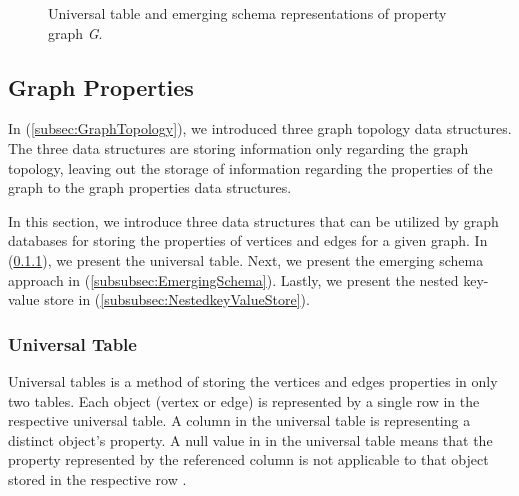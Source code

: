 {\begin{figure}[H]
{        \label{fig:VertexEmergingSchema}
    }
\centering
    \caption{Universal table and emerging schema representations of property graph \textit{G}.}
    \label{fig:GraphProperties_logical}
\end{figure}

\subsection{Graph Properties}
\label{subsec:GraphProperties}

In (\ref{subsec:GraphTopology}), we introduced three graph topology data structures. The three data structures are storing information only regarding the graph topology, leaving out the storage of information regarding the properties of the graph to the graph properties data structures. 

In this section, we introduce three data structures that can be utilized by graph databases for storing the properties of vertices and edges for a given graph. In (\ref{subsubsec:UniversalTable}), we present the universal table. Next, we present the emerging schema approach in (\ref{subsubsec:EmergingSchema}). Lastly, we present the nested key-value store in (\ref{subsubsec:NestedkeyValueStore}).

\subsubsection{Universal Table}
\label{subsubsec:UniversalTable}

Universal tables is a method of storing the vertices and edges properties in only two tables. Each object (vertex or edge) is represented by a single row in the respective universal table. A column in the universal table is representing a distinct object's property. A null value in in the universal table means that the property represented by the referenced column is not applicable to that object stored in the respective row \cite{Paradies2017}.

}
